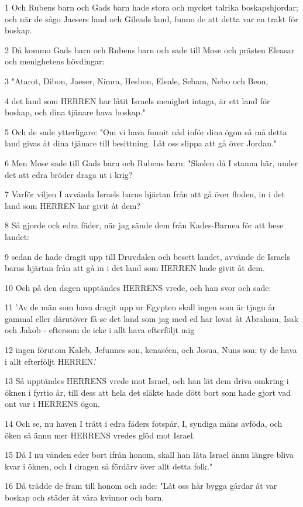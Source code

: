 \par 1 Och Rubens barn och Gads barn hade stora och mycket talrika boskapshjordar; och när de sågo Jaesers land och Gileads land, funno de att detta var en trakt för boskap.
\par 2 Då kommo Gads barn och Rubens barn och sade till Mose och prästen Eleasar och menighetens hövdingar:
\par 3 "Atarot, Dibon, Jaeser, Nimra, Hesbon, Eleale, Sebam, Nebo och Beon,
\par 4 det land som HERREN har låtit Israels menighet intaga, är ett land för boskap, och dina tjänare hava boskap."
\par 5 Och de sade ytterligare: "Om vi hava funnit nåd inför dina ögon så må detta land givas åt dina tjänare till besittning. Låt oss slippa att gå över Jordan."
\par 6 Men Mose sade till Gads barn och Rubens barn: "Skolen då I stanna här, under det att edra bröder draga ut i krig?
\par 7 Varför viljen I avvända Israels barns hjärtan från att gå över floden, in i det land som HERREN har givit åt dem?
\par 8 Så gjorde ock edra fäder, när jag sände dem från Kades-Barnea för att bese landet:
\par 9 sedan de hade dragit upp till Druvdalen och besett landet, avvände de Israels barns hjärtan från att gå in i det land som HERREN hade givit åt dem.
\par 10 Och på den dagen upptändes HERRENS vrede, och han svor och sade:
\par 11 'Av de män som hava dragit upp ur Egypten skall ingen som är tjugu år gammal eller därutöver få se det land som jag med ed har lovat åt Abraham, Isak och Jakob - eftersom de icke i allt hava efterföljt mig
\par 12 ingen förutom Kaleb, Jefunnes son, kenaséen, och Josua, Nuns son; ty de hava i allt efterföljt HERREN.'
\par 13 Så upptändes HERRENS vrede mot Israel, och han lät dem driva omkring i öknen i fyrtio år, till dess att hela det släkte hade dött bort som hade gjort vad ont var i HERRENS ögon.
\par 14 Och se, nu haven I trätt i edra fäders fotspår, I, syndiga mäns avföda, och öken så ännu mer HERRENS vredes glöd mot Israel.
\par 15 Då I nu vänden eder bort ifrån honom, skall han låta Israel ännu längre bliva kvar i öknen, och I dragen så fördärv över allt detta folk."
\par 16 Då trädde de fram till honom och sade: "Låt oss här bygga gårdar åt var boskap och städer åt våra kvinnor och barn.
